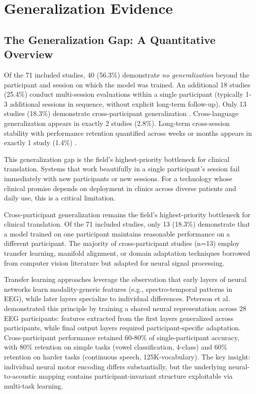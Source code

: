 
\section{Generalization Evidence}
\label{sec:generalization}

\subsection{The Generalization Gap: A Quantitative Overview}

Of the 71 included studies, 40 (56.3\%) demonstrate \textit{no generalization} beyond the participant and session on which the model was trained. An additional 18 studies (25.4\%) conduct multi-session evaluations within a single participant (typically 1-3 additional sessions in sequence, without explicit long-term follow-up). Only 13 studies (18.3\%) demonstrate cross-participant generalization \cite{Peterson2021,deBorman2024}. Cross-language generalization appears in exactly 2 studies (2.8\%). Long-term cross-session stability with performance retention quantified across weeks or months appears in exactly 1 study (1.4\%) \cite{Ye2025}.

This generalization gap is the field's highest-priority bottleneck for clinical translation. Systems that work beautifully in a single participant's session fail immediately with new participants or new sessions. For a technology whose clinical promise depends on deployment in clinics across diverse patients and daily use, this is a critical limitation.

Cross-participant generalization remains the field's highest-priority bottleneck for clinical translation. Of the 71 included studies, only 13 (18.3\%) demonstrate that a model trained on one participant maintains reasonable performance on a different participant. The majority of cross-participant studies (n=13) employ transfer learning, manifold alignment, or domain adaptation techniques borrowed from computer vision literature but adapted for neural signal processing.

Transfer learning approaches leverage the observation that early layers of neural networks learn modality-generic features (e.g., spectro-temporal patterns in EEG), while later layers specialize to individual differences. Peterson et al. \cite{Peterson2021} demonstrated this principle by training a shared neural representation across 28 EEG participants: features extracted from the first layers generalized across participants, while final output layers required participant-specific adaptation. Cross-participant performance retained 60-80\% of single-participant accuracy, with 80\% retention on simple tasks (vowel classification, 4-class) and 60\% retention on harder tasks (continuous speech, 125K-vocabulary). The key insight: individual neural motor encoding differs substantially, but the underlying neural-to-acoustic mapping contains participant-invariant structure exploitable via multi-task learning.

